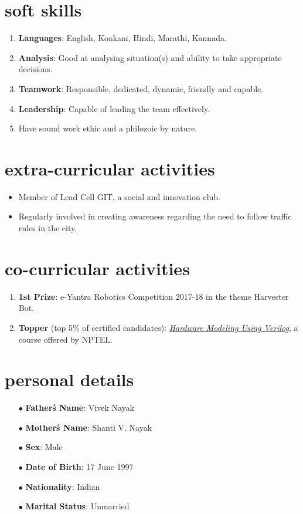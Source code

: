 \documentclass[10pt]{article}
\begin{document}
	\section*{soft skills}
	\begin{enumerate}
		\item \textbf{Languages}: English, Konkani, Hindi, Marathi, Kannada.
		\item \textbf{Analysis}: Good at analysing situation(s) and ability to take appropriate decisions.
		\item\textbf{Teamwork}: Responsible, dedicated, dynamic, friendly and capable.
		\item\textbf{Leadership}: Capable of leading the team effectively. 
		\item Have sound work ethic and a philozoic by nature.
	\end{enumerate}

	\section*{extra-curricular activities}
	\begin{itemize}
		\item Member of Lead Cell GIT, a social and innovation club.
		\item Regularly involved in creating awareness regarding the need to follow traffic rules in the city.
	\end{itemize}

	\section*{co-curricular activities}
	\begin{enumerate}
		\item \textbf{1st Prize}: e-Yantra Robotics Competition 2017-18 in the theme Harvester Bot.
		\item \textbf{Topper} (top 5\% of certified candidates): \href{http://nptel.ac.in/noc/E_Certificate/noc17-cs21/NPTEL17CS21S1150001171010224.jpg}{\textit{Hardware Modeling Using Verilog}}, a course offered by NPTEL.
	\end{enumerate}

	\section*{personal details}
	\begin{itemize}
		\item[$\bullet$] \textbf{Father\'s Name}: Vivek Nayak
		\item[$\bullet$] \textbf{Mother\'s Name}: Shanti V. Nayak
		\item[$\bullet$] \textbf{Sex}: Male
		\item[$\bullet$] \textbf{Date of Birth}: 17 June 1997
		\item[$\bullet$] \textbf{Nationality}: Indian
		\item[$\bullet$] \textbf{Marital Status}: Unmarried
	\end{itemize}
\end{document}
